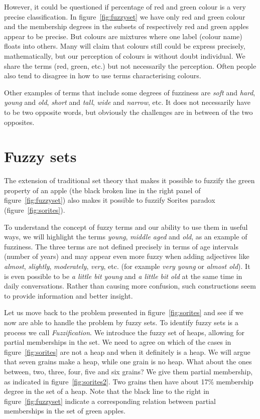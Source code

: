\documentclass[11pt,fleqn]{book} %
\begin{document}
However, it could be questioned if percentage of red and green colour is a very precise classification. In figure~\ref{fig:fuzzyset} we have only red and green colour and the membership degrees in the subsets of respectively red and green apples appear to be precise. But colours are mixtures where one label (colour name) floats into others. Many will claim that colours still could be express precisely, mathematically, but our perception of colours is without doubt individual. We share the terms (red, green, etc.) but not necessarily the perception. Often people also tend to disagree in how to use terms characterising colours.

Other examples of terms that include some degrees of fuzziness are \textit{soft} and \textit{hard}, \textit{young} and \textit{old}, \textit{short} and \textit{tall}, \textit{wide} and \textit{narrow}, etc. It does not necessarily have to be two opposite words, but obviously the challenges are in between of the two opposites.

\section{Fuzzy sets}

The extension of traditional set theory that makes it possible to fuzzify the green property of an apple (the black broken line in the right panel of figure~\ref{fig:fuzzyset}) also makes it possible to fuzzify Sorites paradox (figure~\ref{fig:sorites}).

To understand the concept of fuzzy terms and our ability to use them in useful ways, we will highlight the terms \textit{young}, \textit{middle aged} and \textit{old}, as an example of fuzziness. The three terms are not defined precisely in terms of age intervals (number of years) and may appear even more fuzzy when adding adjectives like \textit{almost}, \textit{slightly}, \textit{moderately}, \textit{very}, etc. (for example \textit{very young} or \textit{almost old}). It is even possible to be \textit{a little bit young} and \textit{a little bit old} at the same time in daily conversations. Rather than causing more confusion, such constructions seem to provide information and better insight.

Let us move back to the problem presented in figure~\ref{fig:sorites} and see if we now are able to handle the problem by fuzzy sets. To identify fuzzy sets is a process we call \textit{Fuzzification}. We introduce the fuzzy set of heaps, allowing for partial memberships in the set. We need to agree on which of the cases in figure~\ref{fig:sorites} are not a heap and when it definitely is a heap. We will argue that seven grains make a heap, while one grain is no heap. What about the ones between, two, three, four, five and six grains? We give them partial membership, as indicated in figure~\ref{fig:sorites2}. Two grains then have about 17\% membership degree in the set of a heap. Note that the black line to the right in figure~\ref{fig:fuzzyset} indicate a corresponding relation between partial memberships in the set of green apples.
\end{document}
